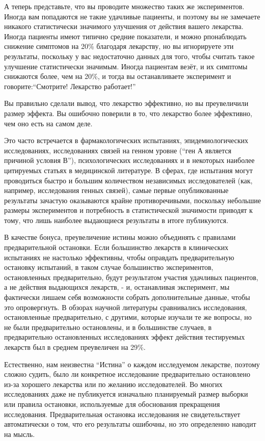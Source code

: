 А теперь представьте, что вы проводите множество таких же экспериментов. Иногда вам попадаются не такие удачливые пациенты, и поэтому вы не замечаете никакого статистически значимого улучшения от действия вашего лекарства. Иногда пациенты имеют типично средние показатели, и можно рпонаблюдать снижение симптомов на 20\% благодаря лекарству, но вы игнорируете эти результаты, поскольку у вас недостаточно данных для того, чтобы считать такое улучшение статистически значимым. Иногда пациентам везёт, и их симптомы снижаются более, чем на 20\%, и тогда вы останавливаете эксперимент и говорите:``Смотрите! Лекарство работает!'' 

Вы правильно сделали вывод, что лекарство эффективно, но вы преувеличили размер эффекта. Вы ошибочно поверили в то, что лекарство более эффективно, чем оно есть на самом деле. 

Это часто встречается в фармакологических испытаниях, эпидемиологических исследованиях, исследованиях связей на генном уровне (``ген А является причиной условия В''), психологических исследованиях и в некоторых наиболее цитируемых статьях в медицинской литературе.\cite{ioannidis_why_2008,ioannidis_contradicted_2005} В сферах, где испытания могут проводиться быстро и большим количеством независимых исследователей (как, например, исследования генных связей), самые первые опубликованные результаты зачастую оказываются крайне противоречивыми, поскольку небольшие размеры экспериментов и потребность в статистической значимости приводят к тому, что лишь наиболее выдающиеся результаты в итоге публикуются.\cite{ioannidis_early_2005} 

В качестве бонуса, преувеличение истины можно объединять с правилами предварительной остановки. Если большинство лекарств в клинических испытаниях не настолько эффективны, чтобы оправдать предварительную остановку испытаний, в таком случае большинство экспериментов, остановленных предварительно, будут результатом участия удачливых пациентов, а не действия выдающихся лекарств, - и, останавливая эксперимент, мы фактически лишаем себя возможности собрать дополнительные данные, чтобы это опровергнуть. В обзорах научной литературы сравнивались исследования, остановленные предварительно, с другими, которые изучали те же вопросы, но не были предварительно остановлены, и в большинстве случаев, в предварительно остановленных исследованиях эффект действия тестируемых лекарств был в среднем преувеличен на 29\%.\cite{bassler_stopping_2010} 

Естественно, нам неизвестна ``Истина'' о каждом исследуемом лекарстве, поэтому сложно судить, было ли конкретное исследование предварительно остановлено из-за хорошего лекарства или по желанию исследователей. Во многих исследованиях даже не публикуется изначально планируемый размер выборки или правила остановки, используемые для обоснования прекращения исследования.\cite{montori_randomized_2005} Предварительная остановка исследования не свидетельствует автоматически о том, что его результаты ошибочны, но это определенно наводит на мысль.  



